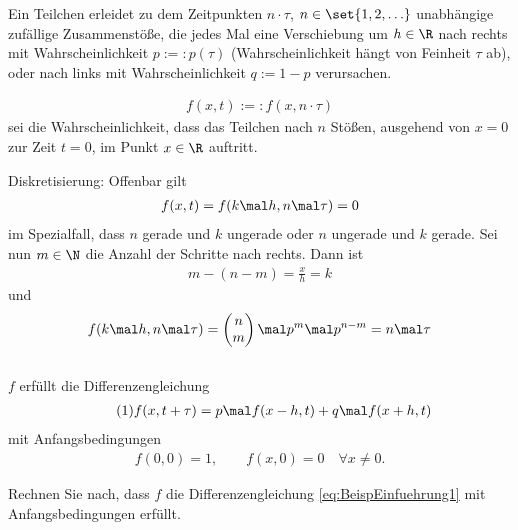 \begin{beisp}\enter
	Ein Teilchen erleidet zu dem Zeitpunkten $n\cdot\tau$, $n\in\set{1,2,\ldots}$ unabhängige zufällige Zusammenstöße, 
	die jedes Mal eine Verschiebung um $h\in\R$ nach rechts mit Wahrscheinlichkeit $p:=:p(\tau)$ (Wahrscheinlichkeit hängt von Feinheit $\tau$ ab), 
	oder nach links mit Wahrscheinlichkeit $q:=1-p$ verursachen.
	
	\begin{notation}
		\begin{align*}
			f(x,t):=:f(x,n\cdot\tau)
		\end{align*}
		sei die Wahrscheinlichkeit, dass das Teilchen nach $n$ Stößen, ausgehend von $x=0$ zur Zeit $t=0$, im Punkt $x\in\R$ auftritt.
	\end{notation}
	Diskretisierung: Offenbar gilt
	\begin{align*}
		f(x,t)=f(k\mal h,n\mal\tau)=0
	\end{align*}
	im Spezialfall, dass  $n$ gerade und $k$ ungerade oder $n$ ungerade und $k$ gerade.
	Sei nun $m\in\N$ die Anzahl der Schritte nach rechts.
	Dann ist
	\begin{align*}
		m-(n-m)=\frac{x}{h}=k
	\end{align*}
	und 
	\begin{align*}
		f(k\mal h,n\mal\tau)=
		\begin{pmatrix}
			n\\
			m
		\end{pmatrix}
		\mal p^m\mal p^{n-m}
		=n\mal\tau
	\end{align*}
	\\
	$f$ erfüllt die Differenzengleichung
	\begin{align}\label{eq:BeispEinfuehrung1}\tag{1}
		f(x,t+\tau)=p\mal f(x-h,t)+q\mal f(x+h,t)
	\end{align}	 
	mit Anfangsbedingungen
	\begin{align*}
		f(0,0)=1,\qquad
		f(x,0)=0\quad
		\forall x\neq0.
	\end{align*}
	\begin{aufgabenr}\label{aufg:1}\enter
		Rechnen Sie nach, dass $f$ die Differenzengleichung \eqref{eq:BeispEinfuehrung1} mit Anfangsbedingungen erfüllt.
	\end{aufgabenr}


\end{beisp}
